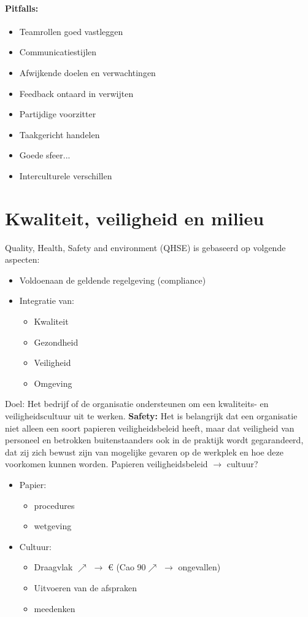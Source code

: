 \documentclass[12pt]{article}
\begin{document}
\paragraph{Pitfalls:}
\begin{itemize}
    \item Teamrollen goed vastleggen 
    \item Communicatiestijlen 
    \item Afwijkende doelen en verwachtingen 
    \item Feedback ontaard in verwijten 
    \item Partijdige voorzitter 
    \item Taakgericht handelen 
    \item Goede sfeer... 
    \item Interculturele verschillen
\end{itemize}
\section{Kwaliteit, veiligheid en milieu}
Quality, Health, Safety and environment (QHSE) is gebaseerd op volgende aspecten:\begin{itemize}
    \item Voldoenaan de geldende regelgeving (compliance)
    \item Integratie van:\begin{itemize}
        \item Kwaliteit
        \item Gezondheid 
        \item Veiligheid 
        \item Omgeving
    \end{itemize}
\end{itemize}
Doel: Het bedrijf of de organisatie ondersteunen om een kwaliteits- en veiligheidscultuur uit te werken.\newline
\textbf{Safety:}
Het is belangrijk dat een organisatie niet alleen een soort papieren veiligheidsbeleid heeft, maar dat veiligheid van personeel en betrokken buitenstaanders ook in de praktijk wordt gegarandeerd, dat zij zich bewust zijn van mogelijke gevaren op de werkplek en hoe deze
voorkomen kunnen worden. Papieren veiligheidsbeleid $\rightarrow$ cultuur?\begin{itemize}
    \item Papier:\begin{itemize}
        \item procedures 
        \item wetgeving
    \end{itemize}
    \item Cultuur:\begin{itemize}
        \item Draagvlak $\nearrow$ $\rightarrow$ € (Cao 90$\nearrow$ $\rightarrow$ ongevallen)
        \item Uitvoeren van de afspraken 
        \item meedenken
    \end{itemize}
\end{itemize}
\end{document}
